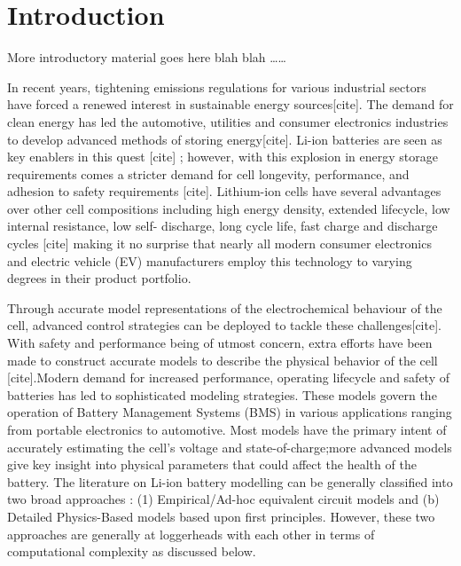 
\clearpage
\chapter{Introduction}\label{ch:intro}

More introductory material goes here blah blah \dots \dots

In recent years, tightening emissions regulations for various industrial sectors
have  forced a  renewed interest  in sustainable  energy sources{[}cite{]}.  The
demand  for  clean  energy  has  led  the  automotive,  utilities  and  consumer
electronics industries to develop  advanced methods of storing energy{[}cite{]}.
Li-ion batteries  are seen as key  enablers in this quest  {[}cite{]} ; however,
with this explosion  in energy storage requirements comes a  stricter demand for
cell  longevity, performance,  and adhesion  to safety  requirements {[}cite{]}.
Lithium-ion cells have several advantages over other cell compositions including
high  energy density,  extended lifecycle,  low internal  resistance, low  self-
discharge, long cycle  life, fast charge and discharge  cycles {[}cite{]} making
it no surprise that nearly all  modern consumer electronics and electric vehicle
(EV) manufacturers  employ this technology  to varying degrees in  their product
portfolio.

Through  accurate  model representations  of  the  electrochemical behaviour  of
the  cell,  advanced  control  strategies   can  be  deployed  to  tackle  these
challenges{[}cite{]}. With safety and performance being of utmost concern, extra
efforts have  been made to  construct accurate  models to describe  the physical
behavior  of  the  cell  {[}cite{]}.Modern  demand  for  increased  performance,
operating  lifecycle   and  safety  of   batteries  has  led   to  sophisticated
modeling strategies.  These models  govern the  operation of  Battery Management
Systems  (BMS) in  various  applications ranging  from  portable electronics  to
automotive. Most  models have  the primary intent  of accurately  estimating the
cell\textquoteright s voltage and  state-of-charge;more advanced models give key
insight into  physical parameters that could  affect the health of  the battery.
The literature on Li-ion battery modelling  can be generally classified into two
broad  approaches  : (1)  Empirical/Ad-hoc  equivalent  circuit models  and  (b)
Detailed  Physics-Based  models  based  upon first  principles.  However,  these
two  approaches  are generally  at  loggerheads  with  each  other in  terms  of
computational complexity as discussed below.

